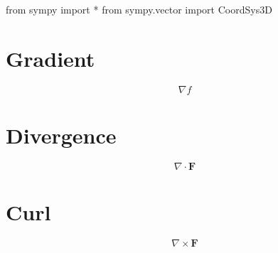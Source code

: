 \documentclass[
  a4paper,
  DIV=11,
  numbers=noendperiod]{scrreprt}
\newenvironment{Shaded}{\begin{snugshade}}{\end{snugshade}}
\newcommand{\ImportTok}[1]{\textcolor[rgb]{0.00,0.46,0.62}{#1}}
\newcommand{\NormalTok}[1]{\textcolor[rgb]{0.00,0.23,0.31}{#1}}
\newcommand{\OperatorTok}[1]{\textcolor[rgb]{0.37,0.37,0.37}{#1}}
\begin{document}
\begin{Shaded}
\begin{Highlighting}[]
\ImportTok{from}\NormalTok{ sympy }\ImportTok{import} \OperatorTok{*}
\ImportTok{from}\NormalTok{ sympy.vector }\ImportTok{import}\NormalTok{ CoordSys3D}
\end{Highlighting}
\end{Shaded}

\section{Gradient}\label{gradient}

\[
\nabla f
\]

\section{Divergence}\label{divergence}

\[
\nabla \cdot \mathbf F
\]

\section{Curl}\label{curl}

\[
\nabla \times \mathbf F
\]
\end{document}
